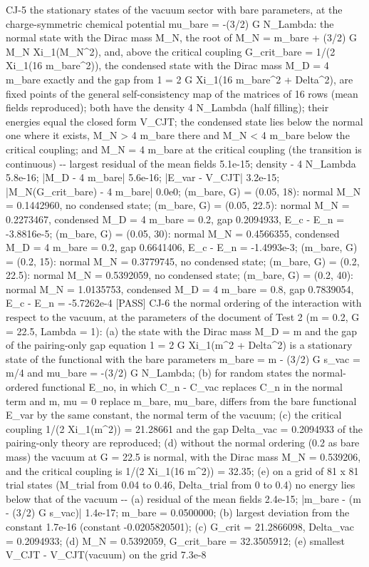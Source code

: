 \documentclass[
  10pt,
]{article}
\newenvironment{Shaded}{}{}
\newcommand{\NormalTok}[1]{#1}
\begin{document}
\begin{Shaded}
\begin{Highlighting}[]
\NormalTok{[PASS] CJ{-}5  the stationary states of the vacuum sector with bare parameters, at the charge{-}symmetric chemical potential mu\_bare = {-}(3/2) G N\_Lambda: the normal state with the Dirac mass M\_N, the root of M\_N = m\_bare + (3/2) G M\_N Xi\_1(M\_N\^{}2), and, above the critical coupling G\_crit\_bare = 1/(2 Xi\_1(16 m\_bare\^{}2)), the condensed state with the Dirac mass M\_D = 4 m\_bare exactly and the gap from 1 = 2 G Xi\_1(16 m\_bare\^{}2 + Delta\^{}2), are fixed points of the general self{-}consistency map of the matrices of 16 rows (mean fields reproduced); both have the density 4 N\_Lambda (half filling); their energies equal the closed form V\_CJT; the condensed state lies below the normal one where it exists, M\_N \textgreater{} 4 m\_bare there and M\_N \textless{} 4 m\_bare below the critical coupling; and M\_N = 4 m\_bare at the critical coupling (the transition is continuous)  {-}{-} largest residual of the mean fields 5.1e{-}15; density {-} 4 N\_Lambda 5.8e{-}16; |M\_D {-} 4 m\_bare| 5.6e{-}16; |E\_var {-} V\_CJT| 3.2e{-}15; |M\_N(G\_crit\_bare) {-} 4 m\_bare| 0.0e0; (m\_bare, G) = (0.05, 18): normal M\_N = 0.1442960, no condensed state; (m\_bare, G) = (0.05, 22.5): normal M\_N = 0.2273467, condensed M\_D = 4 m\_bare = 0.2, gap 0.2094933, E\_c {-} E\_n = {-}3.8816e{-}5; (m\_bare, G) = (0.05, 30): normal M\_N = 0.4566355, condensed M\_D = 4 m\_bare = 0.2, gap 0.6641406, E\_c {-} E\_n = {-}1.4993e{-}3; (m\_bare, G) = (0.2, 15): normal M\_N = 0.3779745, no condensed state; (m\_bare, G) = (0.2, 22.5): normal M\_N = 0.5392059, no condensed state; (m\_bare, G) = (0.2, 40): normal M\_N = 1.0135753, condensed M\_D = 4 m\_bare = 0.8, gap 0.7839054, E\_c {-} E\_n = {-}5.7262e{-}4}
\NormalTok{[PASS] CJ{-}6  the normal ordering of the interaction with respect to the vacuum, at the parameters of the document of Test 2 (m = 0.2, G = 22.5, Lambda = 1): (a) the state with the Dirac mass M\_D = m and the gap of the pairing{-}only gap equation 1 = 2 G Xi\_1(m\^{}2 + Delta\^{}2) is a stationary state of the functional with the bare parameters m\_bare = m {-} (3/2) G s\_vac = m/4 and mu\_bare = {-}(3/2) G N\_Lambda; (b) for random states the normal{-}ordered functional E\_no, in which C\_n {-} C\_vac replaces C\_n in the normal term and m, mu = 0 replace m\_bare, mu\_bare, differs from the bare functional E\_var by the same constant, the normal term of the vacuum; (c) the critical coupling 1/(2 Xi\_1(m\^{}2)) = 21.28661 and the gap Delta\_vac = 0.2094933 of the pairing{-}only theory are reproduced; (d) without the normal ordering (0.2 as bare mass) the vacuum at G = 22.5 is normal, with the Dirac mass M\_N = 0.539206, and the critical coupling is 1/(2 Xi\_1(16 m\^{}2)) = 32.35; (e) on a grid of 81 x 81 trial states (M\_trial from 0.04 to 0.46, Delta\_trial from 0 to 0.4) no energy lies below that of the vacuum  {-}{-} (a) residual of the mean fields 2.4e{-}15; |m\_bare {-} (m {-} (3/2) G s\_vac)| 1.4e{-}17; m\_bare = 0.0500000; (b) largest deviation from the constant 1.7e{-}16 (constant {-}0.0205820501); (c) G\_crit = 21.2866098, Delta\_vac = 0.2094933; (d) M\_N = 0.5392059, G\_crit\_bare = 32.3505912; (e) smallest V\_CJT {-} V\_CJT(vacuum) on the grid 7.3e{-}8}

\end{Highlighting}
\end{Shaded}
\end{document}
